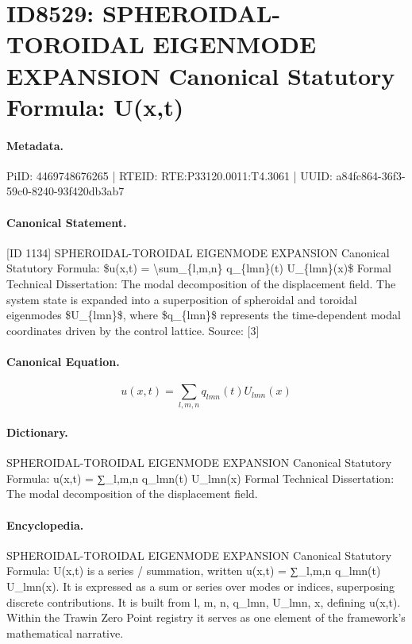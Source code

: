 \section*{ID8529: SPHEROIDAL-TOROIDAL EIGENMODE EXPANSION Canonical Statutory Formula: U(x,t)}
\paragraph{Metadata.}
PiID: 4469748676265 | RTEID: RTE:P33120.0011:T4.3061 | UUID: a84fc864-36f3-59c0-8240-93f420db3ab7

\paragraph{Canonical Statement.}
[ID 1134] SPHEROIDAL-TOROIDAL EIGENMODE EXPANSION Canonical Statutory Formula: \$u(x,t) = \textbackslash{}sum\_\{l,m,n\} q\_\{lmn\}(t) U\_\{lmn\}(x)\$ Formal Technical Dissertation: The modal decomposition of the displacement field. The system state is expanded into a superposition of spheroidal and toroidal eigenmodes \$U\_\{lmn\}\$, where \$q\_\{lmn\}\$ represents the time-dependent modal coordinates driven by the control lattice. Source: [3]

\paragraph{Canonical Equation.}
\[
u(x,t) = \sum_{l,m,n} q_{lmn}(t) U_{lmn}(x)
\]

\paragraph{Dictionary.}
SPHEROIDAL-TOROIDAL EIGENMODE EXPANSION Canonical Statutory Formula: u(x,t) = ∑\_l,m,n q\_lmn(t) U\_lmn(x) Formal Technical Dissertation: The modal decomposition of the displacement field.

\paragraph{Encyclopedia.}
SPHEROIDAL-TOROIDAL EIGENMODE EXPANSION Canonical Statutory Formula: U(x,t) is a series / summation, written u(x,t) = ∑\_l,m,n q\_lmn(t) U\_lmn(x). It is expressed as a sum or series over modes or indices, superposing discrete contributions. It is built from l, m, n, q\_lmn, U\_lmn, x, defining u(x,t). Within the Trawin Zero Point registry it serves as one element of the framework's mathematical narrative.

